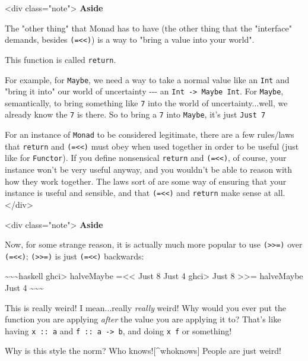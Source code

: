 \documentclass[]{article}
\begin{document}
\textless{}div class="note"\textgreater{} \textbf{Aside}

The "other thing" that Monad has to have (the other thing that the "interface"
demands, besides \texttt{(=\textless{}\textless{})}) is a way to "bring a value
into your world".

This function is called \texttt{return}.

For example, for \texttt{Maybe}, we need a way to take a normal value like an
\texttt{Int} and "bring it into" our world of uncertainty -\/-\/- an
\texttt{Int\ -\textgreater{}\ Maybe\ Int}. For \texttt{Maybe}, semantically, to
bring something like \texttt{7} into the world of uncertainty...well, we already
know the \texttt{7} is there. So to bring a \texttt{7} into \texttt{Maybe}, it's
just \texttt{Just\ 7}

For an instance of \texttt{Monad} to be considered legitimate, there are a few
rules/laws that \texttt{return} and \texttt{(=\textless{}\textless{})} must obey
when used together in order to be useful (just like for \texttt{Functor}). If
you define nonsensical \texttt{return} and \texttt{(=\textless{}\textless{})},
of course, your instance won't be very useful anyway, and you wouldn't be able
to reason with how they work together. The laws sort of are some way of ensuring
that your instance is useful and sensible, and that
\texttt{(=\textless{}\textless{})} and \texttt{return} make sense at all.
\textless{}/div\textgreater{}

\textless{}div class="note"\textgreater{} \textbf{Aside}

Now, for some strange reason, it is actually much more popular to use
\texttt{(\textgreater{}\textgreater{}=)} over
\texttt{(=\textless{}\textless{})}; \texttt{(\textgreater{}\textgreater{}=)} is
just \texttt{(=\textless{}\textless{})} backwards:

\textasciitilde{}\textasciitilde{}\textasciitilde{}haskell ghci\textgreater{}
halveMaybe =\textless{}\textless{} Just 8 Just 4 ghci\textgreater{} Just 8
\textgreater{}\textgreater{}= halveMaybe Just 4
\textasciitilde{}\textasciitilde{}\textasciitilde{}

This is really weird! I mean...really \emph{really} weird! Why would you ever
put the function you are applying \emph{after} the value you are applying it to?
That's like having \texttt{x\ ::\ a} and \texttt{f\ ::\ a\ -\textgreater{}\ b},
and doing \texttt{x\ f} or something!

Why is this style the norm? Who knows!{[}\^{}whoknows{]} People are just weird!
\end{document}
